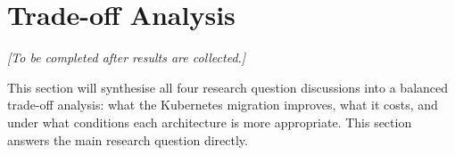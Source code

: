 \section{Trade-off Analysis}

\textit{[To be completed after results are collected.]}

This section will synthesise all four research question discussions into a balanced
trade-off analysis: what the Kubernetes migration improves, what it costs, and under what
conditions each architecture is more appropriate. This section answers the main research
question directly.

